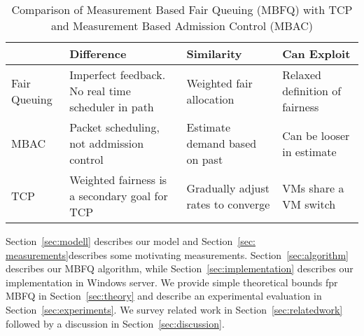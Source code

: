 \begin{table*}[h]
{\footnotesize
\begin{tabular}{l|l|l|l} \\
& Difference & Similarity & Can Exploit \\ \hline
Fair Queuing & Imperfect feedback. No real time scheduler in path & Weighted fair allocation & Relaxed definition of fairness \\ \hline
MBAC & Packet scheduling, not addmission control & Estimate demand based on past & Can be looser in estimate \\ \hline
TCP & Weighted fairness is a secondary goal for TCP & Gradually adjust rates to converge & VMs share a VM switch
\end{tabular}
}
\caption{Comparison of Measurement Based Fair Queuing (MBFQ) with TCP and Measurement Based Admission Control (MBAC) }
\label{microcosm}
\vspace{-3mm}
\end{table*}

Section~\ref{sec:modell} describes our model and Section~\ref{sec: measurements}describes
some motivating measurements.  Section~\ref{sec:algorithm}
describes our MBFQ algorithm, while Section~\ref{sec:implementation} describes
our implementation in Windows server.
We provide simple theoretical bounds fpr MBFQ in
Section~\ref{sec:theory} and describe an experimental evaluation 
in Section~\ref{sec:experiments}.  We survey related work in Section~\ref{sec:relatedwork} followed by a
discussion in Section~\ref{sec:discussion}.
